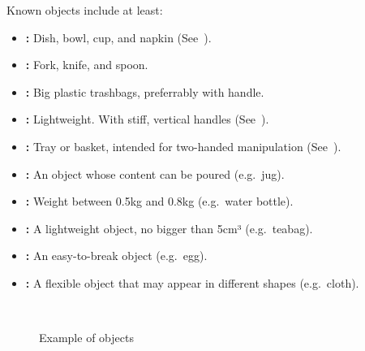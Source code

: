 Known objects include at least:
\begin{itemize}
	\item \textbf{:} Dish, bowl, cup, and napkin (See~).
	\item \textbf{:} Fork, knife, and spoon.
	\item \textbf{:} Big plastic trashbags, preferrably with handle.
	\item \textbf{:} Lightweight. With stiff, vertical handles (See~).
	\item \textbf{:} Tray or basket, intended for two-handed manipulation (See~).
	\item \textbf{:} An object whose content can be poured (e.g.~jug).
	\item \textbf{:} Weight between 0.5kg and 0.8kg (e.g.~water bottle).
	\item \textbf{:} A lightweight object, no bigger than 5cm³ (e.g.~teabag).
	\item \textbf{:} An easy-to-break object (e.g.~egg).
	\item \textbf{:} A flexible object that may appear in different shapes (e.g.~cloth).
\end{itemize}

\begin{figure}[H]
	\centering
	~
	~
	\caption{Example of objects}
	\label{fig:scenario_containers}
\end{figure}

